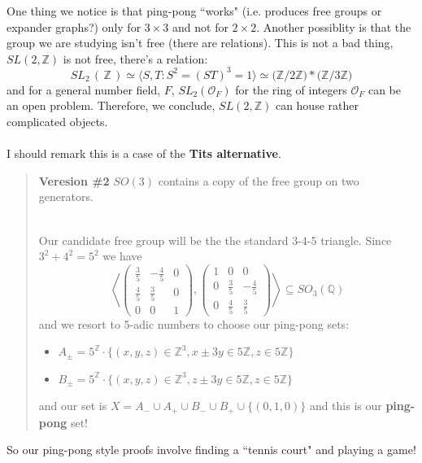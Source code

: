 \documentclass[12pt]{article}
\begin{document}
One thing we notice is that ping-pong ``works" (i.e. produces free groups or expander graphs?) only for $3 \times 3$ and not for $2 \times 2$.  Another possiblity is that the group we are studying isn't free (there are relations).  This is not a bad thing, $SL(2, \mathbb{Z})$ is not free, there's a relation:
$$ SL_2\,(\, \mathbb{Z}\,) \simeq \big\langle S, T: S^2 = (ST)^3 = 1 \big\rangle \simeq \big( \mathbb{Z}/2\mathbb{Z} \big) \ast \big( \mathbb{Z}/3\mathbb{Z} \big) $$
and for a general number field, $F$, $SL_2( \mathcal{O}_F)$ for the ring of integers $\mathcal{O}_F$ can be an open problem.  Therefore, we conclude, $SL(2, \mathbb{Z})$ can house rather complicated objects. \\ \\
I should remark this is a case of the \textbf{Tits alternative}. 
\begin{quotation}\noindent 
\textbf{\color{red!50!white}Veresion \#2} {\color{green!50!blue}$SO(3)$ contains a copy of the free group on two generators.} \\ \\
{\color{green!60!blue} Our candidate free group will be the the standard 3-4-5 triangle.  Since $3^2 + 4^2 = 5^2$ we have
$$ \left\langle \left(\begin{array}{crc}
\frac{3}{5} & -\frac{4}{5} & 0 \\
\frac{4}{5} & \frac{3}{5} & 0 \\
0 & 0 & 1 \end{array}\right),
\left(\begin{array}{crr}
1 & 0 & 0 \\
0 & \frac{3}{5} & -\frac{4}{5}  \\
0 & \frac{4}{5} & \frac{3}{5}  \end{array}\right) \right\rangle \subseteq SO_3(\mathbb{Q}) $$
and we resort to 5-adic numbers to choose our ping-pong sets:
\begin{itemize}
\item $A_\pm= 5^\mathbb{Z} \cdot \{ (x,y,z) \in \mathbb{Z}^3, x \pm 3y \in 5 \mathbb{Z} ,  z \in 5 \mathbb{Z}  \}$
\item $B_\pm = 5^\mathbb{Z} \cdot \{ (x,y,z) \in \mathbb{Z}^3, z \pm 3y \in 5 \mathbb{Z} ,  z \in 5 \mathbb{Z}  \}$
\end{itemize}
and our set is $X =A_- \cup A_+ \cup B_- \cup B_+ \cup \{ (0,1,0)\} $ and this is our \textbf{ping-pong} set!
}\end{quotation} 
So our ping-pong style proofs involve finding a ``tennis court" and playing a game! \\\\
\end{document}
